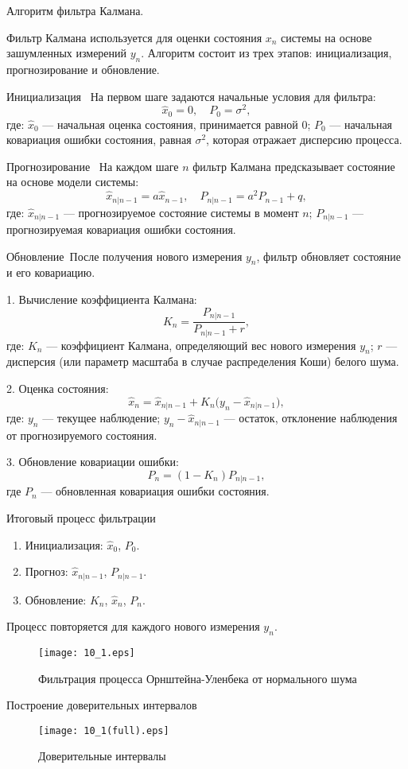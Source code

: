 \documentclass[11pt]{article}
\begin{document}
Алгоритм фильтра Калмана.

Фильтр Калмана используется для оценки состояния $x_n$ системы на основе зашумленных измерений $y_n$. Алгоритм состоит из трех этапов: инициализация, прогнозирование и обновление.  

Инициализация \
На первом шаге задаются начальные условия для фильтра:  
$$
\hat{x}_0 = 0, \quad P_0 = \sigma^2,
$$
где:  
$\hat{x}_0$ — начальная оценка состояния, принимается равной $0$;  
$P_0$ — начальная ковариация ошибки состояния, равная $\sigma^2$, которая отражает дисперсию процесса.  

Прогнозирование \
На каждом шаге $n$ фильтр Калмана предсказывает состояние на основе модели системы:  
$$
\hat{x}_{n|n-1} = a \hat{x}_{n-1}, \quad P_{n|n-1} = a^2 P_{n-1} + q,
$$
где:  
$\hat{x}_{n|n-1}$ — прогнозируемое состояние системы в момент $n$;  
$P_{n|n-1}$ — прогнозируемая ковариация ошибки состояния.  

Обновление\
После получения нового измерения $y_n$, фильтр обновляет состояние и его ковариацию.  

1. Вычисление коэффициента Калмана:
$$
K_n = \frac{P_{n|n-1}}{P_{n|n-1} + r},
$$
где:  
$K_n$ — коэффициент Калмана, определяющий вес нового измерения $y_n$;  
$r$ — дисперсия (или параметр масштаба в случае распределения Коши) белого шума.  

2. Оценка состояния:
$$
\hat{x}_n = \hat{x}_{n|n-1} + K_n \big(y_n - \hat{x}_{n|n-1}\big),
$$
где:  
$y_n$ — текущее наблюдение;  
$y_n - \hat{x}_{n|n-1}$ — остаток, отклонение наблюдения от прогнозируемого состояния.  

3. Обновление ковариации ошибки:
$$
P_n = (1 - K_n) P_{n|n-1},
$$
где $P_n$ — обновленная ковариация ошибки состояния.  


Итоговый процесс фильтрации
\begin{enumerate}
  \item Инициализация: $\hat{x}_0$, $P_0$.  
  \item Прогноз: $\hat{x}_{n|n-1}$, $P_{n|n-1}$.  
  \item Обновление: $K_n$, $\hat{x}_n$, $P_n$.  
\end{enumerate}

Процесс повторяется для каждого нового измерения $y_n$.  

\begin{figure}[ht]
    \texttt{[image: 10\_1.eps]} 
    \caption{Фильтрация процесса Орнштейна-Уленбека от нормального шума}
\end{figure} 
Построение доверительных интервалов
\begin{figure}[ht]
    \texttt{[image: 10\_1(full).eps]} 
    \caption{Доверительные интервалы}
\end{figure} 
\end{document}
